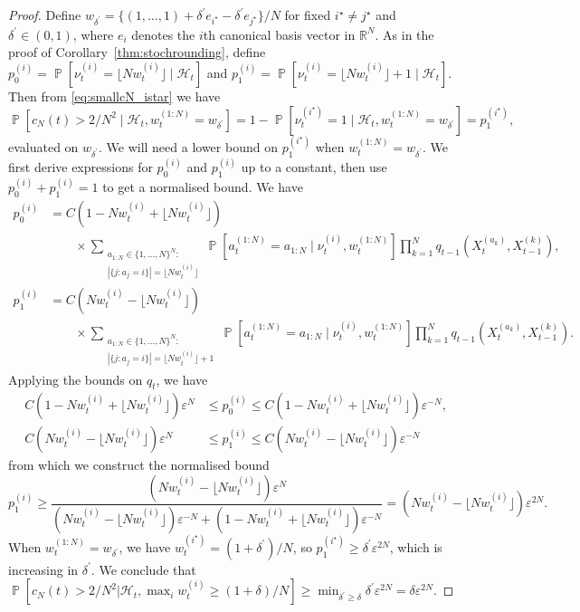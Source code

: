 \documentclass{article} %
\theoremstyle{definition}
\DeclareMathOperator{\Prob}{\mathbb{P}}
\newcommand{\flnw}{\lfloor N w_t^{(i)} \rfloor}
\newcommand{\1}[1]{\mathbbm{1}_{\{#1\}}}
\begin{document}
\begin{proof}
Define $w_{\delta^\prime} = \{(1,\dots,1) + \delta^\prime e_{i^\star} - \delta^\prime e_{j^\star} \} /N$ for fixed $i^\star \neq j^\star$ and $\delta^\prime \in (0,1)$, where $e_i$ denotes the $i$th canonical basis vector in $\mathbb{R}^N$. 
As in the proof of Corollary~\ref{thm:stochrounding}, define $p_0^{(i)} = \Prob[ \nu_t^{(i)} = \flnw \mid \mathcal{H}_t ]$ and $p_1^{(i)} = \Prob[ \nu_t^{(i)} = \flnw +1 \mid \mathcal{H}_t ]$. Then from \eqref{eq:smallcN_istar} we have
\begin{equation*}
\Prob[ c_N(t) > 2/N^2 \mid \mathcal{H}_t, w_t^{(1:N)} = w_{\delta^\prime} ]
= 1- \Prob[ \nu_t^{(i^\star)} = 1 \mid \mathcal{H}_t, w_t^{(1:N)} = w_{\delta^\prime} ]
= p_1^{(i^\star)},
\end{equation*}
evaluated on $w_{\delta^\prime}$.
We will need a lower bound on $p_1^{(i^\star)}$ when $w_t^{(1:N)} = w_{\delta^\prime}$. 
We first derive expressions for $p_0^{(i)}$ and $p_1^{(i)}$ up to a constant, then use $p_0^{(i)} + p_1^{(i)} =1$ to get a normalised bound. We have
\begin{align*} 
p_0^{(i)} &= C (1- N w_t^{(i)} + \flnw) \\
&\qquad \times \sum_{\substack{a_{1:N} \in \{1,\dots,N\}^N : \\ |\{j: a_j=i\}|=\flnw }}
\Prob\left[ a_t^{(1:N)} = a_{1:N} \mid \nu_t^{(i)}, w_t^{(1:N)} \right]
\prod_{k=1}^N q_{t-1}( X_t^{(a_k)}, X_{t-1}^{(k)} ) ,\\
p_1^{(i)} &= C (N w_t^{(i)} - \flnw) \\
&\qquad \times \sum_{\substack{a_{1:N} \in \{1,\dots,N\}^N : \\ |\{j: a_j=i\}|=\flnw +1 }}
\Prob\left[ a_t^{(1:N)} = a_{1:N} \mid \nu_t^{(i)}, w_t^{(1:N)} \right]
\prod_{k=1}^N q_{t-1}( X_t^{(a_k)}, X_{t-1}^{(k)} ) .
\end{align*}
Applying the bounds on $q_t$, we have
\begin{align*}
C (1- N w_t^{(i)} + \flnw) \varepsilon^N &\leq p_0^{(i)} \leq C (1- N w_t^{(i)} + \flnw) \varepsilon^{-N} ,\\
C (N w_t^{(i)} - \flnw) \varepsilon^N &\leq p_1^{(i)} \leq C (N w_t^{(i)} - \flnw) \varepsilon^{-N}
\end{align*}
from which we construct the normalised bound
\begin{equation*}
p_1^{(i)} \geq \frac{ (Nw_t^{(i)} - \flnw) \varepsilon^{N} }{ (Nw_t^{(i)} - \flnw) \varepsilon^{-N} + (1- Nw_t^{(i)} +\flnw) \varepsilon^{-N}}
= (Nw_t^{(i)} - \flnw) \varepsilon^{2N} .
\end{equation*}
When $w_t^{(1:N)} = w_{\delta^\prime}$, we have $w_t^{(i^\star)} = (1+\delta^\prime)/N$, so $p_1^{(i^\star)} \geq \delta^\prime \varepsilon^{2N}$,
which is increasing in $\delta^\prime$.
We conclude that $\Prob[ c_N(t) > 2/N^2 | \mathcal{H}_t, \max_i w_t^{(i)} \geq (1+\delta)/N ] \geq \min_{\delta^\prime \geq \delta} \delta^\prime \varepsilon^{2N} = \delta \varepsilon^{2N}$.


\end{proof}
\end{document}
